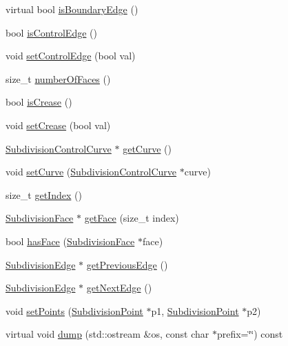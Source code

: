 \begin{DoxyCompactItemize}
\item 
virtual bool \hyperlink{classShipCADGeometry_1_1SubdivisionEdge_ad95a3ec8ba66deb74cbfd3d36428fc34}{is\-Boundary\-Edge} ()
\item 
bool \hyperlink{classShipCADGeometry_1_1SubdivisionEdge_ae47df0c89e604d2185c12ef1be43e535}{is\-Control\-Edge} ()
\item 
void \hyperlink{classShipCADGeometry_1_1SubdivisionEdge_aef8475bab828f5e100dd12699f0aad9b}{set\-Control\-Edge} (bool val)
\item 
size\-\_\-t \hyperlink{classShipCADGeometry_1_1SubdivisionEdge_a9120bf0ef10c838cd69e402eecd8c896}{number\-Of\-Faces} ()
\item 
bool \hyperlink{classShipCADGeometry_1_1SubdivisionEdge_a26be9f91b5fae2c62b99ea501e4a6015}{is\-Crease} ()
\item 
void \hyperlink{classShipCADGeometry_1_1SubdivisionEdge_ad0313b8844a81c5802533376a09fce99}{set\-Crease} (bool val)
\item 
\hyperlink{classShipCADGeometry_1_1SubdivisionControlCurve}{Subdivision\-Control\-Curve} $\ast$ \hyperlink{classShipCADGeometry_1_1SubdivisionEdge_afb80c9ae06d2bb9bb596e2eac6efa993}{get\-Curve} ()
\item 
void \hyperlink{classShipCADGeometry_1_1SubdivisionEdge_a6412679e0438dac8545200df59480783}{set\-Curve} (\hyperlink{classShipCADGeometry_1_1SubdivisionControlCurve}{Subdivision\-Control\-Curve} $\ast$curve)
\item 
size\-\_\-t \hyperlink{classShipCADGeometry_1_1SubdivisionEdge_a4be990243bb29ead43c76171197130d5}{get\-Index} ()
\item 
\hyperlink{classShipCADGeometry_1_1SubdivisionFace}{Subdivision\-Face} $\ast$ \hyperlink{classShipCADGeometry_1_1SubdivisionEdge_a55dc9daab165567ed40e37f9e01ee766}{get\-Face} (size\-\_\-t index)
\item 
bool \hyperlink{classShipCADGeometry_1_1SubdivisionEdge_a286bc4d7959703a153945e3bcb9c9ad3}{has\-Face} (\hyperlink{classShipCADGeometry_1_1SubdivisionFace}{Subdivision\-Face} $\ast$face)
\item 
\hyperlink{classShipCADGeometry_1_1SubdivisionEdge}{Subdivision\-Edge} $\ast$ \hyperlink{classShipCADGeometry_1_1SubdivisionEdge_a7c1fe2cad6e7b8a0e532768b4a395137}{get\-Previous\-Edge} ()
\item 
\hyperlink{classShipCADGeometry_1_1SubdivisionEdge}{Subdivision\-Edge} $\ast$ \hyperlink{classShipCADGeometry_1_1SubdivisionEdge_aebb50514ff119a1484f7c7505a527a2b}{get\-Next\-Edge} ()
\item 
void \hyperlink{classShipCADGeometry_1_1SubdivisionEdge_affa2f4fab16979100d12f1823b26aa9c}{set\-Points} (\hyperlink{classShipCADGeometry_1_1SubdivisionPoint}{Subdivision\-Point} $\ast$p1, \hyperlink{classShipCADGeometry_1_1SubdivisionPoint}{Subdivision\-Point} $\ast$p2)
\item 
virtual void \hyperlink{classShipCADGeometry_1_1SubdivisionEdge_a14cc58877644ebd7b7ebffbdf8ef87f7}{dump} (std\-::ostream \&os, const char $\ast$prefix=\char`\"{}\char`\"{}) const 
\end{DoxyCompactItemize}
